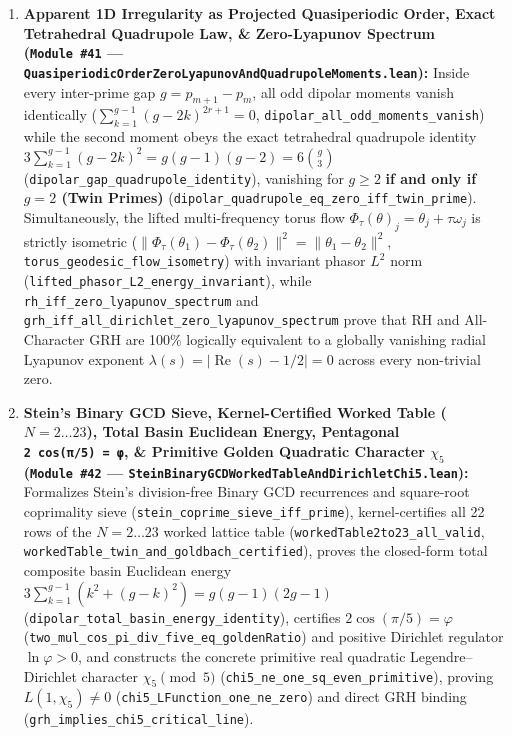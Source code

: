 \documentclass[
  11pt,
]{article}
\begin{document}
\begin{enumerate}
  (\texttt{rh\_iff\_zeta\_zeroFree\_gt\_half},
  \texttt{grh\_iff\_all\_dirichlet\_zeroFree\_gt\_half}) together with
  complex differentiability of the Möbius reciprocal \(1/\zeta(s)\), the
  Liouville generating ratio \(\zeta(2s)/\zeta(s)\), and
  \(1/L(s, \chi)\) across \(\operatorname{Re}(s) > 1/2\)
  (\texttt{rh\_implies\_liouville\_and\_mobius\_holomorphic\_gt\_half},
  \texttt{grh\_implies\_nonprincipal\_inv\_LFunction\_holomorphic\_gt\_half}).
\item
  \textbf{Apparent 1D Irregularity as Projected Quasiperiodic Order,
  Exact Tetrahedral Quadrupole Law, \& Zero-Lyapunov Spectrum
  (\texttt{Module\ \#41} ---
  \texttt{QuasiperiodicOrderZeroLyapunovAndQuadrupoleMoments.lean}):}
  Inside every inter-prime gap \(g = p_{m+1} - p_m\), all odd dipolar
  moments vanish identically (\(\sum_{k=1}^{g-1}(g-2k)^{2r+1} = 0\),
  \texttt{dipolar\_all\_odd\_moments\_vanish}) while the second moment
  obeys the exact tetrahedral quadrupole identity
  \(3\sum_{k=1}^{g-1}(g-2k)^2 = g(g-1)(g-2) = 6\binom{g}{3}\)
  (\texttt{dipolar\_gap\_quadrupole\_identity}), vanishing for
  \(g \ge 2\) \textbf{if and only if \(g = 2\) (Twin Primes)}
  (\texttt{dipolar\_quadrupole\_eq\_zero\_iff\_twin\_prime}).
  Simultaneously, the lifted multi-frequency torus flow
  \(\Phi_\tau(\theta)_j = \theta_j + \tau\omega_j\) is strictly
  isometric
  (\(\|\Phi_\tau(\theta_1) - \Phi_\tau(\theta_2)\|^2 = \|\theta_1 - \theta_2\|^2\),
  \texttt{torus\_geodesic\_flow\_isometry}) with invariant phasor
  \(L^2\) norm (\texttt{lifted\_phasor\_L2\_energy\_invariant}), while
  \texttt{rh\_iff\_zero\_lyapunov\_spectrum} and
  \texttt{grh\_iff\_all\_dirichlet\_zero\_lyapunov\_spectrum} prove that
  RH and All-Character GRH are 100\% logically equivalent to a globally
  vanishing radial Lyapunov exponent
  \(\lambda(s) = |\operatorname{Re}(s) - 1/2| = 0\) across every
  non-trivial zero.
\item
  \textbf{Stein's Binary GCD Sieve, Kernel-Certified Worked Table
  (\(N = 2 \dots 23\)), Total Basin Euclidean Energy, Pentagonal
  \texttt{2\ cos(π/5)\ =\ φ}, \& Primitive Golden Quadratic Character
  \(\chi_5\) (\texttt{Module\ \#42} ---
  \texttt{SteinBinaryGCDWorkedTableAndDirichletChi5.lean}):} Formalizes
  Stein's division-free Binary GCD recurrences and square-root
  coprimality sieve (\texttt{stein\_coprime\_sieve\_iff\_prime}),
  kernel-certifies all 22 rows of the \(N = 2 \dots 23\) worked lattice
  table (\texttt{workedTable2to23\_all\_valid},
  \texttt{workedTable\_twin\_and\_goldbach\_certified}), proves the
  closed-form total composite basin Euclidean energy
  \(3\sum_{k=1}^{g-1}(k^2 + (g-k)^2) = g(g-1)(2g-1)\)
  (\texttt{dipolar\_total\_basin\_energy\_identity}), certifies
  \(2\cos(\pi/5) = \varphi\)
  (\texttt{two\_mul\_cos\_pi\_div\_five\_eq\_goldenRatio}) and positive
  Dirichlet regulator \(\ln\varphi > 0\), and constructs the concrete
  primitive real quadratic Legendre--Dirichlet character
  \(\chi_5 \pmod 5\) (\texttt{chi5\_ne\_one\_sq\_even\_primitive}),
  proving \(L(1, \chi_5) \ne 0\)
  (\texttt{chi5\_LFunction\_one\_ne\_zero}) and direct GRH binding
  (\texttt{grh\_implies\_chi5\_critical\_line}).
\end{enumerate}
\end{document}
